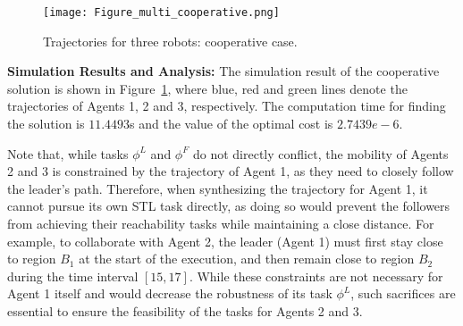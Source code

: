 \documentclass[letterpaper, 10 pt, conference]{ieeeconf}
\begin{document}





\begin{figure}[t]
    \centering
    \texttt{[image: Figure\_multi\_cooperative.png]}
    \caption{Trajectories for three robots: cooperative case.}
    \label{fig:multi-coop}
\end{figure}




{\bf Simulation Results and Analysis: }
The simulation result of the cooperative solution is shown in Figure~\ref{fig:multi-coop}, where  blue, red and green  lines denote the trajectories of Agents 1, 2 and 3, respectively. 
The computation time for finding the solution is $11.4493$s and the value of the optimal cost is $2.7439e-6$. 

 
Note that, while tasks \(\phi^L\) and \(\phi^F\) do not directly conflict, the mobility of Agents 2 and 3 is constrained by the trajectory of Agent 1, as they need to closely follow the leader's path. Therefore, when synthesizing the trajectory for Agent 1, it cannot pursue its own STL task directly, as doing so would prevent the followers from achieving their reachability tasks while maintaining a close distance. 
For example, to collaborate with Agent 2, the leader (Agent 1) must first stay close to region \(B_1\) at the start of the execution, and then remain close to region \(B_2\) during the time interval \([15, 17]\). While these constraints are not necessary for Agent 1 itself and would decrease the robustness of its task \(\phi^L\), such sacrifices are essential to ensure the feasibility of the tasks for Agents 2 and 3.
 


\end{document}
